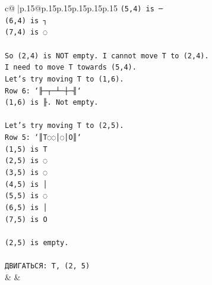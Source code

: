 \documentclass{article}
\begin{document}
{\begin{supertabular}{c@{$\;$}|p{.15\linewidth}@{}p{.15\linewidth}p{.15\linewidth}p{.15\linewidth}p{.15\linewidth}p{.15\linewidth}}
{{{\texttt{(5,4) is ─} \\
\texttt{(6,4) is ┐} \\
\texttt{(7,4) is ◌} \\
\\ 
\texttt{So (2,4) is NOT empty. I cannot move T to (2,4).} \\
\texttt{I need to move T towards (5,4).} \\
\texttt{Let's try moving T to (1,6).} \\
\texttt{Row 6: `╟─┬─┴─┼─╢`} \\
\texttt{(1,6) is ╟. Not empty.} \\
\\ 
\texttt{Let's try moving T to (2,5).} \\
\texttt{Row 5: `║T◌◌│◌│O║`} \\
\texttt{(1,5) is T} \\
\texttt{(2,5) is ◌} \\
\texttt{(3,5) is ◌} \\
\texttt{(4,5) is │} \\
\texttt{(5,5) is ◌} \\
\texttt{(6,5) is │} \\
\texttt{(7,5) is O} \\
\\ 
\texttt{(2,5) is empty.} \\
\\ 
\texttt{ДВИГАТЬСЯ: T, (2, 5)} \\
            }
        }
    }
    & & \\ \\


\end{supertabular}}
\end{document}
